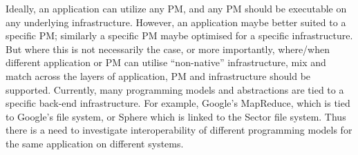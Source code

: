 \documentclass[3p,twocolumn]{elsarticle}
\begin{document}
Ideally, an application can utilize any PM, and any PM should be
executable on any underlying infrastructure. However, an application
maybe better suited to a specific PM; similarly a specific PM maybe
optimised for a specific infrastructure. But where this is not
necessarily the case, or more importantly, where/when different
application or PM can utilise ``non-native'' infrastructure, mix and
match across the layers of application, PM and infrastructure should
be supported.  Currently, many programming models and abstractions are
tied to a specific back-end infrastructure.  For example, Google's
MapReduce, which is tied to Google's file system, or
Sphere\cite{sectorsphere09} which is linked to the Sector file
system. Thus there is a need to investigate interoperability of
different programming models for the same application on different
systems.



 



\end{document}
